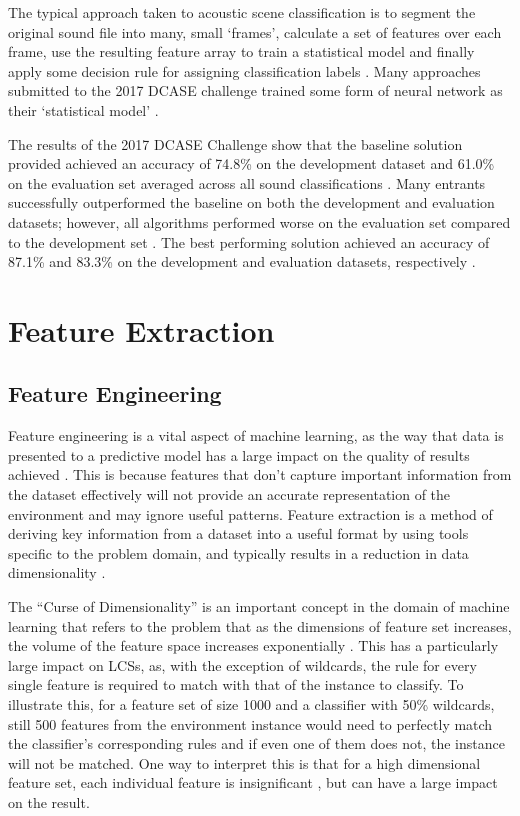 \documentclass[11pt]{article}
\begin{document}
The typical approach taken to acoustic scene classification is to segment the original sound file into many, small `frames', calculate a set of features over each frame, use the resulting feature array to train a statistical model and finally apply some decision rule for assigning classification labels \cite[pp.~18--19]{Barchiesi2015}. Many approaches submitted to the 2017 DCASE challenge trained some form of neural network as their `statistical model' \cite{DCASE2017asc}.

The results of the 2017 DCASE Challenge show that the baseline solution provided achieved an accuracy of 74.8\% on the development dataset and 61.0\% on the evaluation set averaged across all sound classifications \cite{DCASE2017asc}. Many entrants successfully outperformed the baseline on both the development and evaluation datasets; however, all algorithms performed worse on the evaluation set compared to the development set \cite{DCASE2017asc}. The best performing solution achieved an accuracy of 87.1\% and 83.3\% on the development and evaluation datasets, respectively \cite{DCASE2017asc,Mun2017}.






\section{Feature Extraction}
\label{sec:feat}

\subsection{Feature Engineering}
\label{sec:featEng}

Feature engineering is a vital aspect of machine learning, as the way that data is presented to a predictive model has a large impact on the quality of results achieved \cite{Brownlee2014}. This is because features that don't capture important information from the dataset effectively will not provide an accurate representation of the environment and may ignore useful patterns. Feature extraction is a method of deriving key information from a dataset into a useful format by using tools specific to the problem domain, and typically results in a reduction in data dimensionality \cite{Howbert2012}.

The ``Curse of Dimensionality'' is an important concept in the domain of machine learning that refers to the problem that as the dimensions of feature set increases, the volume of the feature space increases exponentially \cite{Keogh2010}. This has a particularly large impact on LCSs, as, with the exception of wildcards, the rule for every single feature is required to match with that of the instance to classify. To illustrate this, for a feature set of size 1000 and a classifier with 50\% wildcards, still 500 features from the environment instance would need to perfectly match the classifier's corresponding rules and if even one of them does not, the instance will not be matched. One way to interpret this is that for a high dimensional feature set, each individual feature is insignificant \cite{Keogh2010}, but can have a large impact on the result.
\end{document}
